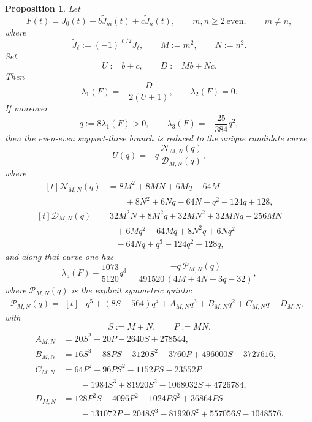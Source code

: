 \documentclass[11pt,reqno]{amsart}
\newtheorem{proposition}[theorem]{Proposition}
\theoremstyle{definition}
\begin{document}
\begin{proposition}\label{prop:anchor-eveneven-candidate}
Let
\[
F(t)=J_0(t)+b\widetilde J_m(t)+c\widetilde J_n(t),
\qquad
m,n\ge 2\ \text{even},
\qquad
m\neq n,
\]
where
\[
\widetilde J_\ell:=(-1)^{\ell/2}J_\ell,
\qquad
M:=m^2,
\qquad
N:=n^2.
\]
Set
\[
U:=b+c,
\qquad
D:=Mb+Nc.
\]
Then
\[
\lambda_1(F)=-\frac{D}{2(U+1)},
\qquad
\lambda_2(F)=0.
\]
If moreover
\[
q:=8\lambda_1(F)>0,
\qquad
\lambda_3(F)=-\frac{25}{384}q^2,
\]
then the even-even support-three branch is reduced to the unique candidate curve
\[
U(q)=-q\,\frac{\mathcal N_{M,N}(q)}{\mathcal D_{M,N}(q)},
\]
where
\[
\begin{aligned}[t]
\mathcal N_{M,N}(q)
&=8M^2+8MN+6Mq-64M\\
&\qquad +8N^2+6Nq-64N+q^2-124q+128,
\end{aligned}
\]
\[
\begin{aligned}[t]
\mathcal D_{M,N}(q)
&=32M^2N+8M^2q+32MN^2+32MNq-256MN\\
&\qquad +6Mq^2-64Mq+8N^2q+6Nq^2\\
&\qquad -64Nq+q^3-124q^2+128q,
\end{aligned}
\]
and along that curve one has
\[
\lambda_5(F)-\frac{1073}{5120}q^3
=
\frac{-q\,\mathcal P_{M,N}(q)}
{491520\,(4M+4N+3q-32)},
\]
where $\mathcal P_{M,N}(q)$ is the explicit symmetric quintic
\[
\mathcal P_{M,N}(q)
=
\begin{aligned}[t]
&q^5+(8S-564)q^4+A_{M,N}q^3+B_{M,N}q^2+C_{M,N}q+D_{M,N},
\end{aligned}
\]
with
\[
S:=M+N,
\qquad
P:=MN.
\]
\[
\begin{aligned}
A_{M,N}&=20S^2+20P-2640S+278544,\\
B_{M,N}&=16S^3+88PS-3120S^2-3760P+496000S-3727616,\\
C_{M,N}&=64P^2+96PS^2-1152PS-23552P\\
&\qquad -1984S^3+81920S^2-1068032S+4726784,\\
D_{M,N}&=128P^2S-4096P^2-1024PS^2+36864PS\\
&\qquad -131072P+2048S^3-81920S^2+557056S-1048576.
\end{aligned}
\]
\end{proposition}
\end{document}
